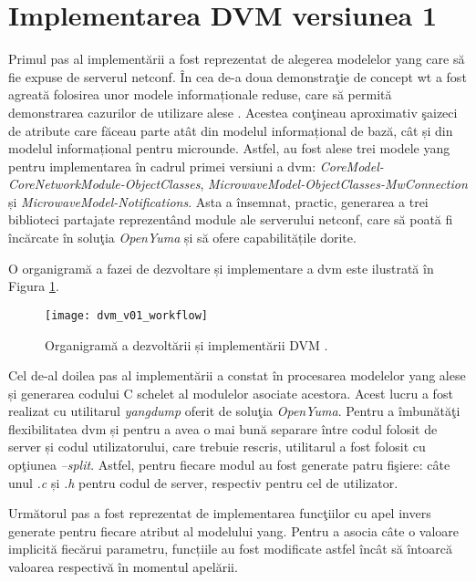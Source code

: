 \section{Implementarea DVM versiunea 1}

Primul pas al implementării a fost reprezentat de alegerea modelelor \gls{yang} care să fie expuse de serverul \gls{netconf}. În cea de-a doua demonstraţie de concept \gls{wt} a fost agreată folosirea unor modele informaționale reduse, care să permită demonstrarea cazurilor de utilizare alese \cite{onf2016_poc2}. Acestea conţineau aproximativ şaizeci de atribute care făceau parte atât din modelul informațional de bază, cât și din modelul informațional pentru microunde. Astfel, au fost alese trei modele \gls{yang} pentru implementarea în cadrul primei versiuni a \gls{dvm}: \textit{CoreModel-CoreNetworkModule-ObjectClasses}, \textit{MicrowaveModel-ObjectClasses-MwConnection} și \textit{MicrowaveModel-Notifications}. Asta a însemnat, practic, generarea a trei biblioteci partajate reprezentând module ale serverului \gls{netconf}, care să poată fi încărcate în soluţia \textit{OpenYuma} și să ofere capabilitățile dorite.

O organigramă a fazei de dezvoltare și implementare a \gls{dvm} este ilustrată în Figura \ref{fig:dvm_v01_workflow}.

\begin{figure}[h]
	\centering
	\texttt{[image: dvm\_v01\_workflow]}
	\caption{Organigramă a dezvoltării și implementării DVM \cite{stancu2016default}.}
	\label{fig:dvm_v01_workflow}
\end{figure}

Cel de-al doilea pas al implementării a constat în procesarea modelelor \gls{yang} alese și generarea codului C schelet al modulelor asociate acestora. Acest lucru a fost realizat cu utilitarul \textit{yangdump} oferit de soluţia \textit{OpenYuma}. Pentru a îmbunătăţi flexibilitatea \gls{dvm} și pentru a avea o mai bună separare între codul folosit de server și codul utilizatorului, care trebuie rescris, utilitarul a fost folosit cu opţiunea \textit{--split}. Astfel, pentru fiecare modul au fost generate patru fişiere: câte unul \textit{.c} și \textit{.h} pentru codul de server, respectiv pentru cel de utilizator.

Următorul pas a fost reprezentat de implementarea funcţiilor cu apel invers generate pentru fiecare atribut al modelului \gls{yang}. Pentru a asocia câte o valoare implicită fiecărui parametru, funcțiile au fost modificate astfel încât să întoarcă valoarea respectivă în momentul apelării.


